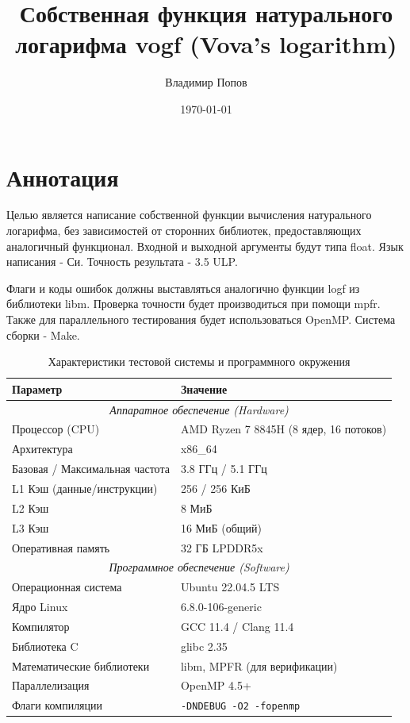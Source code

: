 \documentclass[12pt]{extarticle}
\title{Собственная функция натурального логарифма vogf (Vova's logarithm)}
\author{Владимир Попов}
\date{\today}
\begin{document}
\maketitle

\newpage

\tableofcontents

\newpage

\section{Аннотация}

Целью является написание собственной функции вычисления натурального логарифма, без зависимостей от сторонних библиотек, предоставляющих аналогичный функционал. Входной и выходной аргументы будут типа float. Язык написания - Си. Точность результата - 3.5 ULP. 

Флаги и коды ошибок должны выставляться аналогично функции logf из библиотеки libm. Проверка точности будет производиться при помощи mpfr. Также для параллельного тестирования будет использоваться OpenMP. Система сборки - Make.

\begin{table}[ht]
\centering
\label{tab:system_specs}
\begin{tabular}{ll}
\toprule
\textbf{Параметр} & \textbf{Значение} \\
\midrule
\multicolumn{2}{c}{\textit{Аппаратное обеспечение (Hardware)}} \\
\midrule
Процессор (CPU) & AMD Ryzen 7 8845H (8 ядер, 16 потоков) \\
Архитектура & x86\_64 \\
Базовая / Максимальная частота & 3.8 ГГц / 5.1 ГГц \\
L1 Кэш (данные/инструкции) & 256 / 256 КиБ \\
L2 Кэш & 8 МиБ \\
L3 Кэш & 16 МиБ (общий) \\
Оперативная память & 32 ГБ LPDDR5x \\
\midrule
\multicolumn{2}{c}{\textit{Программное обеспечение (Software)}} \\
\midrule
Операционная система & Ubuntu 22.04.5 LTS \\
Ядро Linux & 6.8.0-106-generic \\
Компилятор & GCC 11.4 / Clang 11.4 \\
Библиотека C & glibc 2.35 \\
Математические библиотеки & libm, MPFR (для верификации) \\
Параллелизация & OpenMP 4.5+ \\
Флаги компиляции & \texttt{-DNDEBUG -O2 -fopenmp} \\
\bottomrule
\end{tabular}

\caption{Характеристики тестовой системы и программного окружения}
\end{table}
\end{document}
